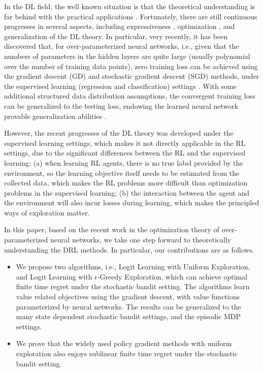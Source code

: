 In the DL field, the well known situation is that the theoretical understanding is far behind with the practical applications \citep{goodfellow2016deep,zhang2016understanding}. Fortunately, there are still continuous progresses in several aspects, including expressiveness \citep{cybenko1989approximation,raghu2017expressive}, optimization \citep{kawaguchi2016deep,li2017convergence,li2018learning,du2018gradientA,du2018gradientB,allen2018convergenceA,allen2018convergenceB}, and generalization \cite{neyshabur2017exploring,allen2018learning} of the DL theory. In particular, very recently, it has been discovered that, for over-parameterized neural networks, i.e., given that the numbers of parameters in the hidden layers are quite large (usually polynomial over the number of training data points), zero training loss can be achieved using the gradient descent (GD) and stochastic gradient descent (SGD) methods, under the supervised learning (regression and classification) settings \citep{li2018learning,du2018gradientA,du2018gradientB,allen2018convergenceA,allen2018convergenceB}. With some additional structured data distribution assumptions, the convergent training loss can be generalized to the testing loss, endowing the learned neural network provable generalization abilities \citep{li2018learning,allen2018learning}.

However, the recent progresses of the DL theory was developed under the supervised learning settings, which makes it not directly applicable in the RL settings, due to the significant differences between the RL and the supervised learning: (a) when learning RL agents, there is no true label provided by the environment, so the learning objective itself needs to be estimated from the collected data, which makes the RL problems more difficult than optimization problems in the supervised learning; (b) the interaction between the  agent and the environment will also incur losses during learning, which makes the principled ways of exploration matter.

In this paper, based on the recent work in the optimization theory of over-parameterized neural networks, we take one step forward to theoretically understanding the DRL methods. In particular, our contributions are as follows.

\begin{itemize}
    \item We propose two algorithms, i.e., Logit Learning with Uniform Exploration, and Logit Learning with $\epsilon$-Greedy Exploration, which can achieve optimal finite time regret under the stochastic bandit setting. The algorithms learn value related objectives using the gradient descent, with value functions parameterized by neural networks. The results can be generalized to the many state dependent stochastic bandit settings, and the episodic MDP settings.
    \item We prove that the widely used policy gradient methods with uniform exploration also enjoys sublinear finite time regret under the stochastic bandit setting.
\end{itemize}

